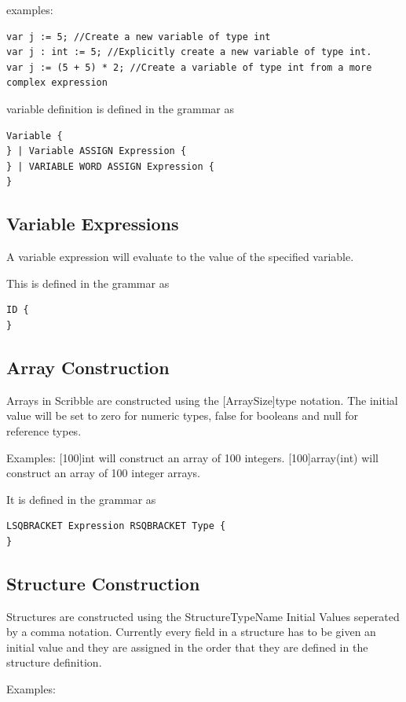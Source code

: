\documentclass[]{final_report}
\begin{document}
examples:
\begin{verbatim}
var j := 5; //Create a new variable of type int
var j : int := 5; //Explicitly create a new variable of type int.
var j := (5 + 5) * 2; //Create a variable of type int from a more complex expression
\end{verbatim}

variable definition is defined in the grammar as
\begin{verbatim}
Variable {
} | Variable ASSIGN Expression {
} | VARIABLE WORD ASSIGN Expression {
}
\end{verbatim}

\subsection{Variable Expressions}

A variable expression will evaluate to the value of the specified variable.

This is defined in the grammar as \begin{verbatim}
ID {
}
\end{verbatim}

\subsection{Array Construction}

Arrays in Scribble are constructed using the [ArraySize]type notation. The initial value will be set to zero for numeric types, false for booleans and null for reference types.

Examples:
[100]int will construct an array of 100 integers.
[100]array(int) will construct an array of 100 integer arrays.

It is defined in the grammar as
\begin{verbatim}
LSQBRACKET Expression RSQBRACKET Type {
}
\end{verbatim}

\subsection{Structure Construction}

Structures are constructed using the StructureTypeName { Initial Values seperated by a comma } notation. Currently every field in a structure has to be given an initial value and they are assigned in the order that they are defined in the structure definition.

Examples:
\end{document}
